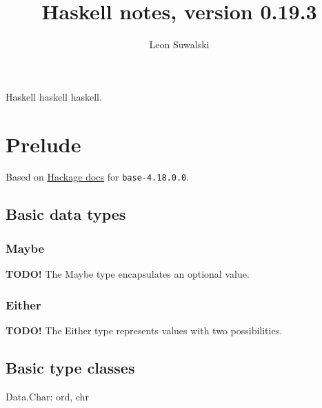 \documentclass{charun}
\title{Haskell notes, version 0.19.3}
\author{Leon Suwalski}
\begin{document}
\begin{multicols*}{3}
\maketitle
\raggedright
Haskell haskell haskell.
\section{Prelude}
Based on \href{https://hackage.haskell.org/package/base-4.18.0.0/docs/Prelude.html}{Hackage docs} for \texttt{base-4.18.0.0}.

\subsection{Basic data types}




\subsubsection{Maybe}
\textbf{TODO!}
The Maybe type encapsulates an optional value.

\subsubsection{Either}
\textbf{TODO!}
The Either type represents values with two possibilities.





\subsection{Basic type classes}









\newpage








Data.Char: ord, chr


\end{multicols*}
\end{document}
